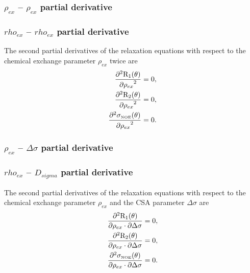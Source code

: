 \begin{latexonly}
    \subsubsection{$\rho_{ex}$ -- $\rho_{ex}$ partial derivative}
\end{latexonly}
\begin{htmlonly}
    \subsubsection{$rho_{ex}$ -- $rho_{ex}$ partial derivative}
\end{htmlonly}

The second partial derivatives of the relaxation equations with respect to the chemical exchange parameter $\rho_{ex}$ twice are
\begin{subequations}
\begin{align}
    \frac{\partial^2 \mathrm{R}_1(\theta)}{{\partial \rho_{ex}}^2} &= 0,        \label{eq: Ri': d2R1/dRex2} \\
    \frac{\partial^2 \mathrm{R}_2(\theta)}{{\partial \rho_{ex}}^2} &= 0,        \label{eq: Ri': d2R2/dRex2} \\
    \frac{\partial^2 \sigma_{\scriptscriptstyle \mathrm{NOE}}(\theta)}{{\partial \rho_{ex}}^2} &= 0. \label{eq: Ri': d2sigmaNOE/dRex2}
\end{align}
\end{subequations}


\begin{latexonly}
    \subsubsection{$\rho_{ex}$ -- $\Delta\sigma$ partial derivative}
\end{latexonly}
\begin{htmlonly}
    \subsubsection{$rho_{ex}$ -- $D_{sigma}$ partial derivative}
\end{htmlonly}

The second partial derivatives of the relaxation equations with respect to the chemical exchange parameter $\rho_{ex}$ and the CSA parameter $\Delta\sigma$ are
\begin{subequations}
\begin{align}
    \frac{\partial^2 \mathrm{R}_1(\theta)}{\partial \rho_{ex} \cdot \partial \Delta\sigma} &= 0,        \label{eq: Ri': d2R1/dRex.dCSA} \\
    \frac{\partial^2 \mathrm{R}_2(\theta)}{\partial \rho_{ex} \cdot \partial \Delta\sigma} &= 0,        \label{eq: Ri': d2R2/dRex.dCSA} \\
    \frac{\partial^2 \sigma_{\scriptscriptstyle \mathrm{NOE}}(\theta)}{\partial \rho_{ex} \cdot \partial \Delta\sigma} &= 0. \label{eq: Ri': d2sigmaNOE/dRex.dCSA}
\end{align}
\end{subequations}


